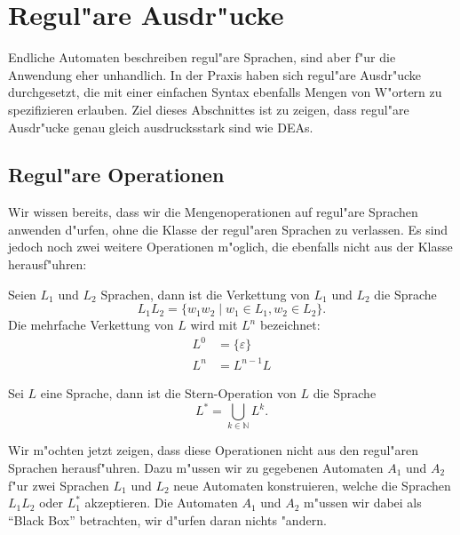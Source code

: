 \section{Regul"are Ausdr"ucke\label{regulaer:re}}
Endliche Automaten beschreiben regul"are Sprachen, sind aber f"ur die
Anwendung eher unhandlich. In der Praxis haben sich regul"are Ausdr"ucke
durchgesetzt, die mit einer einfachen Syntax ebenfalls Mengen von
W"ortern zu spezifizieren erlauben. Ziel dieses Abschnittes ist
zu zeigen, dass regul"are Ausdr"ucke genau gleich ausdrucksstark sind
wie DEAs.

\subsection{Regul"are Operationen\label{regulaer:regulaere-operationen}}
Wir wissen bereits, dass wir die Mengenoperationen auf regul"are
Sprachen anwenden d"urfen, ohne die Klasse der regul"aren Sprachen
zu verlassen.
Es sind jedoch noch zwei weitere Operationen m"oglich, die ebenfalls
nicht aus der Klasse herausf"uhren:

\begin{definition}
Seien $L_1$ und $L_2$ Sprachen, dann ist die
Verkettung von $L_1$ und $L_2$ die Sprache
\[
L_1L_2=\{w_1w_2\;|\;w_1\in L_1,w_2\in L_2\}.
\]
Die mehrfache Verkettung von $L$ wird mit $L^n$ bezeichnet:
\begin{align*}
L^0&=\{\varepsilon\}\\
L^n&=L^{n-1}L
\end{align*}
\end{definition}

\begin{definition}
Sei $L$ eine Sprache, dann ist die Stern-Operation
von $L$ die Sprache
\[
L^*=\bigcup_{k\in\mathbb N} L^k.
\]
\end{definition}

Wir m"ochten jetzt zeigen, dass diese Operationen nicht aus den
regul"aren Sprachen herausf"uhren. Dazu m"ussen wir zu gegebenen
Automaten $A_1$ und $A_2$ f"ur zwei Sprachen $L_1$ und $L_2$
neue Automaten konstruieren, welche
die Sprachen $L_1L_2$ oder $L_1^*$ akzeptieren. Die Automaten
$A_1$ und $A_2$ m"ussen wir dabei als ``Black Box'' betrachten,
wir d"urfen daran nichts "andern.

